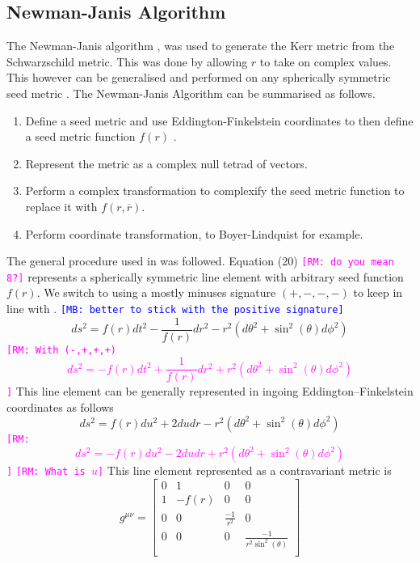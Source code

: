 \documentclass[12pt]{iopart}
\def\mbc#1{\textcolor{blue}{\tt[MB: #1]}}
\def\rmc#1{\textcolor{magenta}{\tt[RM: #1]}}
\begin{document}
 \subsection{Newman-Janis Algorithm}
 The Newman-Janis algorithm \cite{Newman:1965tw}, was used to generate the Kerr metric from the Schwarzschild metric. This was done by allowing $r$ to take on complex values. This however can be generalised and performed on any spherically symmetric seed metric \cite{Drake:1997hh, Drake:1998gf}. The Newman-Janis Algorithm can be summarised as follows. 
 \begin{enumerate}
  \item Define a seed metric and use Eddington-Finkelstein coordinates to then define a seed metric function $f(r)$ .
  \item Represent the metric as a complex null tetrad of vectors.
   \item Perform a complex transformation to complexify the seed metric function to replace it with $f(r,\overline{r})$.
   \item Perform coordinate transformation, to Boyer-Lindquist for example.
 \end{enumerate}
 The general procedure used in \cite{Drake:1997hh, Drake:1998gf} was followed. Equation (20) \rmc{do you mean 8?} represents a spherically symmetric line element with arbitrary seed function $f(r)$. We switch to using a mostly minuses signature $(+,-,-,-)$ to keep in line with \cite{Drake:1997hh}. \mbc{better to stick with the positive signature}
 \begin{equation} 
     ds^2=  f(r)dt^2-\frac{1}{f(r)}dr^2-r^2(d\theta^2+\sin^2(\theta)d\phi^2)
 \end{equation}
 \rmc{With (-,+,+,+)
\begin{equation} 
     ds^2 = - f(r)dt^2 + \frac{1}{f(r)}dr^2 + r^2(d\theta^2+\sin^2(\theta)d\phi^2)
 \end{equation}}
 This line element can be generally represented in ingoing Eddington–Finkelstein coordinates as follows
 \begin{equation} 
     ds^2=  f(r)du^2+2dudr-r^2(d\theta^2+\sin^2(\theta)d\phi^2)
\end{equation}
\rmc{\begin{equation} 
     ds^2 = - f(r)du^2 - 2dudr + r^2(d\theta^2+\sin^2(\theta)d\phi^2)
\end{equation}}
\rmc{What is $u$} This line element represented as a contravariant metric is
\\
\[
   g^{\mu \nu}= 
  \left[ {\begin{array}{ccccc}
0 & 1 & 0 & 0\\
1 & -f(r) & 0 & 0\\
0 & 0 & \frac{-1}{r^2} & 0\\
0 & 0 & 0 & \frac{-1}{r^2\sin^2(\theta)}\\
  \end{array} } \right]
\]
\end{document}
